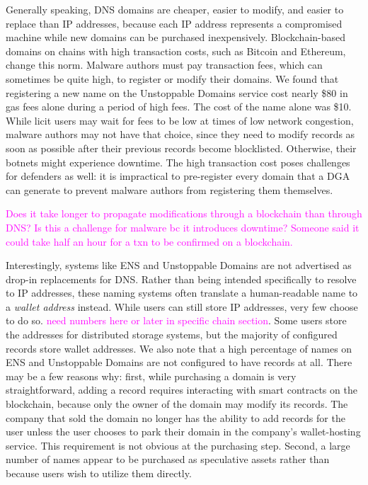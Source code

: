 \documentclass[conference]{IEEEtran}
\newcommand{\randall}{\ding{110}\ding{43}\textcolor{magenta}}
\newcommand{\randall}{}
\begin{document}
Generally speaking, DNS domains are cheaper, easier to modify, and 
easier to replace than IP 
addresses, because each IP address represents a compromised machine while 
new domains can be 
purchased inexpensively. Blockchain-based domains on chains with high 
transaction costs, such as 
Bitcoin and Ethereum, change this norm. Malware authors must pay 
transaction fees, which can 
sometimes be quite high, to register or modify their domains. We found that 
registering a new name 
on the Unstoppable Domains service cost nearly \$80 in gas fees alone during a 
period of high fees. 
The cost of the name alone was \$10. While licit users may wait for fees to be 
low at times of low 
network congestion, malware authors may not have that choice, since they 
need to modify records as 
soon as possible after their previous records become blocklisted. Otherwise, 
their botnets might 
experience downtime. The high transaction cost poses challenges for 
defenders as well: it is 
impractical to pre-register every domain that a DGA can generate to prevent 
malware authors from 
registering them themselves. 

\randall{Does it take longer to propagate modifications through a blockchain 
than through DNS? Is this a challenge for malware bc it introduces 
downtime? 
Someone said it could take half an hour for a txn to be confirmed on a 
blockchain.}

Interestingly, systems like ENS and Unstoppable Domains are not advertised as 
drop-in replacements for DNS. Rather than being intended specifically to 
resolve to IP addresses, these naming systems often translate a human-readable 
name to a \emph{wallet address} instead. While users can still store IP 
addresses, very few choose to do so. \randall{need numbers here or later in 
specific chain section}. Some users store the addresses for distributed storage 
systems, but the majority of configured records store wallet addresses. We also 
note that a high percentage of names on ENS and Unstoppable Domains are not 
configured to have records at all. There may be a few reasons why: first, while 
purchasing a domain is very straightforward, adding a record requires 
interacting with smart contracts on the blockchain, because only the owner of 
the domain may modify its records. The company that sold the domain no longer 
has the ability to add records for the user unless the user chooses to park 
their domain in the company's wallet-hosting service. This requirement is not 
obvious at the purchasing step. Second, a large number of names appear to be 
purchased as speculative assets rather than because users wish to utilize them 
directly. 
\end{document}
